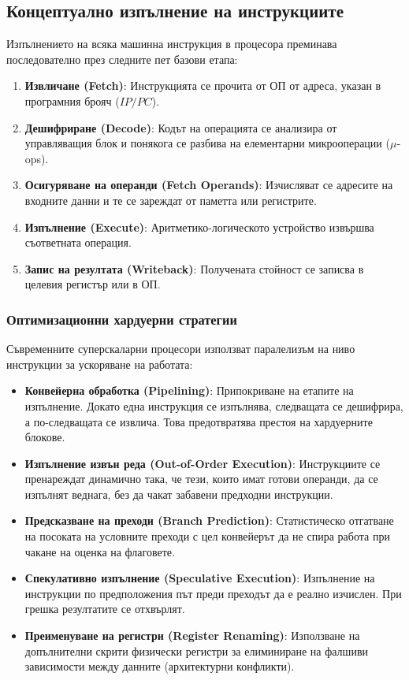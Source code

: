 \documentclass{scrartcl}
\begin{document}
\begin{FlushLeft}
\subsection{Концептуално изпълнение на инструкциите} 
Изпълнението на всяка машинна инструкция в процесора преминава последователно през следните пет базови етапа:
\begin{enumerate}
    \item \textbf{Извличане (Fetch)}: Инструкцията се прочита от ОП от адреса, указан в програмния брояч ($IP / PC$).
    \item \textbf{Дешифриране (Decode)}: Кодът на операцията се анализира от управляващия блок и понякога се разбива на елементарни микрооперации ($\mu$-ops).
    \item \textbf{Осигуряване на операнди (Fetch Operands)}: Изчисляват се адресите на входните данни и те се зареждат от паметта или регистрите.
    \item \textbf{Изпълнение (Execute)}: Аритметико-логическото устройство извършва съответната операция.
    \item \textbf{Запис на резултата (Writeback)}: Получената стойност се записва в целевия регистър или в ОП.
\end{enumerate}

\subsubsection{Оптимизационни хардуерни стратегии}
Съвременните суперскаларни процесори използват паралелизъм на ниво инструкции за ускоряване на работата:
\begin{itemize}
    \item \textbf{Конвейерна обработка (Pipelining)}: Припокриване на етапите на изпълнение. Докато една инструкция се изпълнява, следващата се дешифрира, а по-следващата се извлича. Това предотвратява престоя на хардуерните блокове.
    \item \textbf{Изпълнение извън реда (Out-of-Order Execution)}: Инструкциите се пренареждат динамично така, че тези, които имат готови операнди, да се изпълнят веднага, без да чакат забавени предходни инструкции.
    \item \textbf{Предсказване на преходи (Branch Prediction)}: Статистическо отгатване на посоката на условните преходи с цел конвейерът да не спира работа при чакане на оценка на флаговете.
    \item \textbf{Спекулативно изпълнение (Speculative Execution)}: Изпълнение на инструкции по предположения път преди преходът да е реално изчислен. При грешка резултатите се отхвърлят.
    \item \textbf{Преименуване на регистри (Register Renaming)}: Използване на допълнителни скрити физически регистри за елиминиране на фалшиви зависимости между данните (архитектурни конфликти).
\end{itemize}


\end{FlushLeft}
\end{document}

